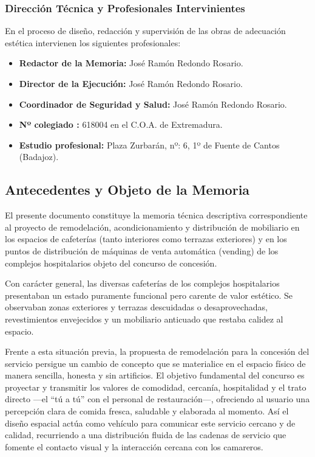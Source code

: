 \documentclass[12pt,a4paper]{article}
\newcommand{\todo}[1]{#1}
\begin{document}
\subsubsection{Dirección Técnica y Profesionales Intervinientes}
En el proceso de diseño, redacción y supervisión de las obras de adecuación estética intervienen los siguientes profesionales:
\begin{itemize}
    \item \textbf{Redactor de la Memoria:} \todo{José Ramón Redondo Rosario}.
    \item \textbf{Director de la Ejecución:} \todo{José Ramón Redondo Rosario}.
    \item \textbf{Coordinador de Seguridad y Salud:} \todo{José Ramón Redondo Rosario}.
\end{itemize}

\begin{itemize}
\item \textbf{Nº colegiado :} 618004 en el C.O.A. de Extremadura.
\end{itemize}
\begin{itemize}
\item \textbf{Estudio profesional:}  Plaza Zurbarán, nº: 6, 1º de Fuente de Cantos (Badajoz).
\end{itemize}

\subsection{Antecedentes y Objeto de la Memoria}
El presente documento constituye la memoria técnica descriptiva correspondiente al proyecto de remodelación, acondicionamiento y distribución de mobiliario en los espacios de cafeterías (tanto interiores como terrazas exteriores) y en los puntos de distribución de máquinas de venta automática (vending) de los complejos hospitalarios objeto del concurso de concesión.

Con carácter general, las diversas cafeterías de los complejos hospitalarios presentaban un estado puramente funcional pero carente de valor estético. Se observaban zonas exteriores y terrazas descuidadas o desaprovechadas, revestimientos envejecidos y un mobiliario anticuado que restaba calidez al espacio. 

Frente a esta situación previa, la propuesta de remodelación para la concesión del servicio persigue un cambio de concepto que se materialice en el espacio físico de manera sencilla, honesta y sin artificios. El objetivo fundamental del concurso es proyectar y transmitir los valores de comodidad, cercanía, hospitalidad y el trato directo ---el ``tú a tú'' con el personal de restauración---, ofreciendo al usuario una percepción clara de comida fresca, saludable y elaborada al momento. Así el diseño espacial actúa como vehículo para comunicar este servicio cercano y de calidad, recurriendo a una distribución fluida de las cadenas de servicio que fomente el contacto visual y la interacción cercana con los camareros.
\end{document}
